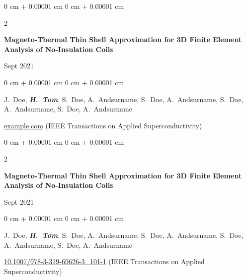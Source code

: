 \documentclass[10pt, letterpaper]{article}
\newenvironment{onecolentry}{
    \begin{adjustwidth}{
        0 cm + 0.00001 cm
    }{
        0 cm + 0.00001 cm
    }
}{
    \end{adjustwidth}
} %
\newenvironment{twocolentry}[2][]{
    \onecolentry
    \def\secondColumn{#2}
    \setcolumnwidth{\fill, 4.5 cm}
    \begin{paracol}{2}
}{
    \switchcolumn \raggedleft \secondColumn
    \end{paracol}
    \endonecolentry
} %
\begin{document}
        \vspace{0.2 cm}

        \begin{samepage}
            \begin{twocolentry}{
                Sept 2021
            }
                \textbf{Magneto-Thermal Thin Shell Approximation for 3D Finite Element Analysis of No-Insulation Coils}
            \end{twocolentry}

            \vspace{0.10 cm}
            
            \begin{onecolentry}
                \mbox{J. Doe}, \mbox{\textbf{\textit{H. Tom}}}, \mbox{S. Doe}, \mbox{A. Andsurname}, \mbox{S. Doe}, \mbox{A. Andsurname}, \mbox{S. Doe}, \mbox{A. Andsurname}, \mbox{S. Doe}, \mbox{A. Andsurname}

                \vspace{0.10 cm}
                
        \href{https://example.com}{example.com} (IEEE Transactions on Applied Superconductivity)\end{onecolentry}
        \end{samepage}

        \vspace{0.2 cm}

        \begin{samepage}
            \begin{twocolentry}{
                Sept 2021
            }
                \textbf{Magneto-Thermal Thin Shell Approximation for 3D Finite Element Analysis of No-Insulation Coils}
            \end{twocolentry}

            \vspace{0.10 cm}
            
            \begin{onecolentry}
                \mbox{J. Doe}, \mbox{\textbf{\textit{H. Tom}}}, \mbox{S. Doe}, \mbox{A. Andsurname}, \mbox{S. Doe}, \mbox{A. Andsurname}, \mbox{S. Doe}, \mbox{A. Andsurname}, \mbox{S. Doe}, \mbox{A. Andsurname}

                \vspace{0.10 cm}
                
        \href{https://doi.org/10.1007/978-3-319-69626-3_101-1}{10.1007/978-3-319-69626-3\_101-1}
         (IEEE Transactions on Applied Superconductivity)\end{onecolentry}
        \end{samepage}
\end{document}
